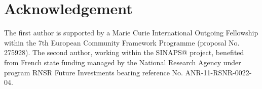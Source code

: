 \documentclass[12p]{amsart}
\begin{document}
\section*{Acknowledgement}

The first author is supported by a Marie Curie International Outgoing Fellowship within the 7th European Community Framework Programme (proposal No. 275928). The second author, working within the SINAPS@ project, benefited from French state funding managed by the National Research Agency under program RNSR Future Investments bearing reference No. ANR-11-RSNR-0022-04. 











\end{document}
